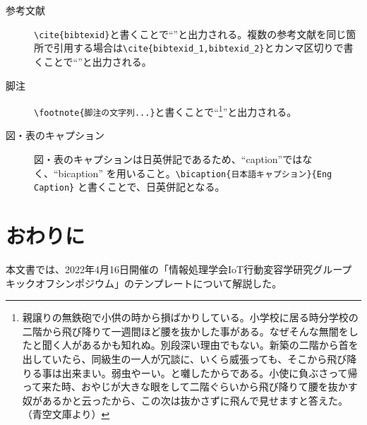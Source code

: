 \documentclass[a4paper,twocolumn,9pt]{jsarticle}
\begin{document}
\begin{description}
    \item[参考文献]
        \texttt{\textbackslash{}cite\{bibtexid\}}と書くことで``\cite{bib:ara_gamification_ipsj2016}''と出力される。複数の参考文献を同じ箇所で引用する場合は\texttt{\textbackslash{}cite\{bibtexid\_1,bibtexid\_2\}}とカンマ区切りで書くことで``\cite{bib:ara_gamification_ipsj2016,bib:yugontech_iotNudge_ubicomp2021poster}''と出力される。
    \item[脚注]
        \texttt{\textbackslash{}footnote\{脚注の文字列...\}}と書くことで``\footnote{親譲りの無鉄砲で小供の時から損ばかりしている。小学校に居る時分学校の二階から飛び降りて一週間ほど腰を抜かした事がある。なぜそんな無闇をしたと聞く人があるかも知れぬ。別段深い理由でもない。新築の二階から首を出していたら、同級生の一人が冗談に、いくら威張っても、そこから飛び降りる事は出来まい。弱虫やーい。と囃したからである。小使に負ぶさって帰って来た時、おやじが大きな眼をして二階ぐらいから飛び降りて腰を抜かす奴があるかと云ったから、この次は抜かさずに飛んで見せますと答えた。（青空文庫より）}''と出力される。
    \item[図・表のキャプション]
        図・表のキャプションは日英併記であるため、``caption''ではなく、``bicaption'' を用いること。\texttt{\textbackslash{}bicaption\{日本語キャプション\}\{Eng Caption\}} と書くことで、日英併記となる。
\end{description}

\section{おわりに}
\label{sec:conclusion}

本文書では、2022年4月16日開催の「情報処理学会IoT行動変容学研究グループキックオフシンポジウム」のテンプレートについて解説した。




\small


\end{document}
